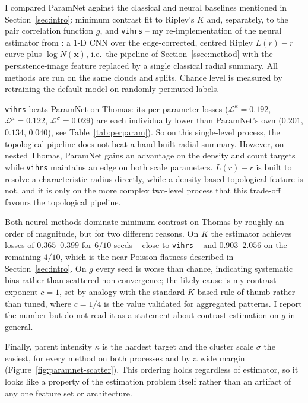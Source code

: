 \documentclass[11pt,a4paper]{article}
\newcommand{\pc}{\mathbf{x}}
\begin{document}
I compared ParamNet against the classical and neural baselines mentioned in 
Section~\ref{sec:intro}: minimum contrast fit to Ripley's $K$ and, separately,
to the pair correlation function $g$, and \texttt{vihrs} -- my re-implementation
of the neural estimator from \citet{vihrs2022neural}: a 1-D CNN over the
edge-corrected, centred Ripley $L(r)-r$ curve plus $\log N(\pc)$, i.e.\ the
pipeline of Section~\ref{ssec:method} with the persistence-image feature
replaced by a single classical radial summary. All methods are run on the same
clouds and splits. Chance level is measured by retraining
the default model on randomly permuted labels.

\texttt{vihrs} beats ParamNet on Thomas: its per-parameter losses
($\mathcal{L}^\kappa=0.192$, $\mathcal{L}^\mu=0.122$,
$\mathcal{L}^\sigma=0.029$) are each individually lower than ParamNet's own
($0.201$, $0.134$, $0.040$), see Table~\ref{tab:perparam}). So on this single-level
process, the topological pipeline does not beat a hand-built radial summary. However, on
nested Thomas, ParamNet gains an advantage on the density and count targets
while \texttt{vihrs} maintains an edge on both scale parameters. $L(r)-r$ is
built to resolve a characteristic radius directly, while a density-based
topological feature is not, and it is only on the more complex two-level process
that this trade-off favours the topological pipeline.

Both neural methods dominate minimum contrast on Thomas by roughly an order of
magnitude, but for two different reasons. On $K$ the estimator achieves losses
of $0.365$--$0.399$ for $6/10$ seeds -- close to \texttt{vihrs} -- and
$0.903$--$2.056$ on the remaining $4/10$, which is the near-Poisson flatness
described in Section~\ref{sec:intro}. On $g$ every seed is worse than chance,
indicating systematic bias rather than scattered non-convergence; the likely
cause is my contrast exponent $c=1$, set by analogy with
the standard $K$-based rule of thumb rather than tuned, where
$c=1/4$ is the value validated for aggregated patterns. I report the number but
do not read it as a statement about contrast estimation on $g$ in general.

Finally, parent intensity $\kappa$ is the hardest target and the cluster scale
$\sigma$ the easiest, for every method on both processes and by a wide margin
(Figure~\ref{fig:paramnet-scatter}).
This ordering holds regardless of estimator, so it looks like a property of the
estimation problem itself rather than an artifact of any one feature set or
architecture.
\end{document}
